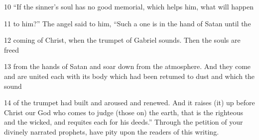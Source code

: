 \par 10 “If the sinner's soul has no good memorial, which helps him, what will happen

\par 11 to him?” The angel said to him, “Such a one is in the hand of Satan until the

\par 12 coming of Christ, when the trumpet of Gabriel sounds. Then the souls are freed

\par 13 from the hands of Satan and soar down from the atmosphere. And they come and are united each with its body which had been retumed to dust and which the sound

\par 14 of the trumpet had built and aroused and renewed. And it raises (it) up before Christ our God who comes to judge (those on) the earth, that is the righteous and the wicked, and requites each for his deeds.” Through the petition of your divinely narrated prophets, have pity upon the readers of this writing.

